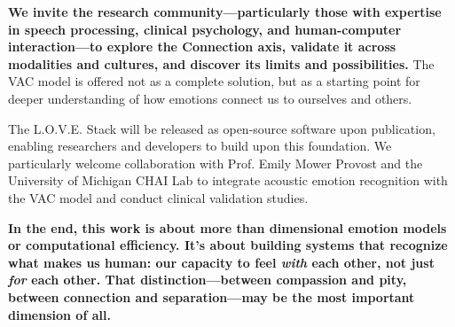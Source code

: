 \textbf{We invite the research community—particularly those with expertise in speech processing, clinical psychology, and human-computer interaction—to explore the Connection axis, validate it across modalities and cultures, and discover its limits and possibilities.} The VAC model is offered not as a complete solution, but as a starting point for deeper understanding of how emotions connect us to ourselves and others.

The L.O.V.E. Stack will be released as open-source software upon publication, enabling researchers and developers to build upon this foundation. We particularly welcome collaboration with Prof. Emily Mower Provost and the University of Michigan CHAI Lab to integrate acoustic emotion recognition with the VAC model and conduct clinical validation studies.

\textbf{In the end, this work is about more than dimensional emotion models or computational efficiency. It's about building systems that recognize what makes us human: our capacity to feel \textit{with} each other, not just \textit{for} each other. That distinction—between compassion and pity, between connection and separation—may be the most important dimension of all.}
